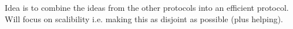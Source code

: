 Idea is to combine the ideas from the other protocols into an efficient protocol.
Will focus on scalibility i.e. making this as disjoint as possible (plus helping).